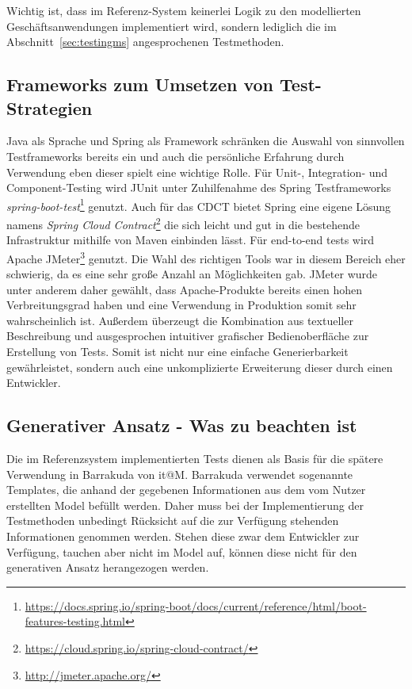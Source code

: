 \documentclass[12pt,a4paper,bibliography=totocnumbered,listof=totocnumbered]{scrartcl}
\begin{document}

Wichtig ist, dass im Referenz-System keinerlei Logik zu den modellierten Geschäftsanwendungen implementiert wird, sondern lediglich die im Abschnitt~\ref{sec:testingms} angesprochenen Testmethoden.

\subsection{Frameworks zum Umsetzen von Test-Strategien}\label{ch:ms-test-frw}

Java als Sprache und Spring als Framework schränken die Auswahl von sinnvollen Testframeworks bereits ein und auch die persönliche Erfahrung durch Verwendung eben dieser spielt eine wichtige Rolle. Für Unit-, Integration- und Component-Testing wird JUnit unter Zuhilfenahme des Spring Testframeworks \textit{spring-boot-test}\footnote{\url{https://docs.spring.io/spring-boot/docs/current/reference/html/boot-features-testing.html}} genutzt.
Auch für das \ac{CDCT} bietet Spring eine eigene Lösung namens \textit{Spring Cloud Contract}\footnote{\url{https://cloud.spring.io/spring-cloud-contract/}} die sich leicht und gut in die bestehende Infrastruktur mithilfe von Maven einbinden lässt.
Für end-to-end tests wird Apache JMeter\footnote{\url{http://jmeter.apache.org/}} genutzt. Die Wahl des richtigen Tools war in diesem Bereich eher schwierig, da es eine sehr große Anzahl an Möglichkeiten gab. JMeter wurde unter anderem daher gewählt, dass Apache-Produkte bereits einen hohen Verbreitungsgrad haben und eine Verwendung in Produktion somit sehr wahrscheinlich ist. Außerdem überzeugt die Kombination aus textueller Beschreibung und ausgesprochen intuitiver grafischer Bedienoberfläche zur Erstellung von Tests. Somit ist nicht nur eine einfache Generierbarkeit gewährleistet, sondern auch eine unkomplizierte Erweiterung dieser durch einen Entwickler.

\subsection{Generativer Ansatz - Was zu beachten ist}

Die im Referenzsystem implementierten Tests dienen als Basis für die spätere Verwendung in Barrakuda von it@M. Barrakuda verwendet sogenannte Templates, die anhand der gegebenen Informationen aus dem vom Nutzer erstellten Model befüllt werden. Daher muss bei der Implementierung der Testmethoden unbedingt Rücksicht auf die zur Verfügung stehenden Informationen genommen werden. Stehen diese zwar dem Entwickler zur Verfügung, tauchen aber nicht im Model auf, können diese nicht für den generativen Ansatz herangezogen werden.
\end{document}
